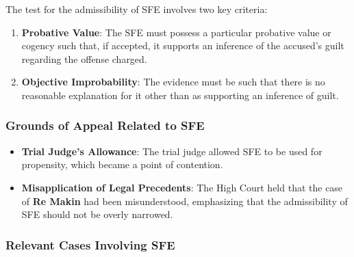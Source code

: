 The test for the admissibility of SFE involves two key criteria:

\begin{enumerate}
\def\labelenumi{\arabic{enumi}.}
\tightlist
\item
  \textbf{Probative Value}: The SFE must possess a particular probative
  value or cogency such that, if accepted, it supports an inference of
  the accused's guilt regarding the offense charged.
\item
  \textbf{Objective Improbability}: The evidence must be such that there
  is no reasonable explanation for it other than as supporting an
  inference of guilt.
\end{enumerate}

\subsubsection{Grounds of Appeal Related to
SFE}\label{grounds-of-appeal-related-to-sfe}

\begin{itemize}
\tightlist
\item
  \textbf{Trial Judge's Allowance}: The trial judge allowed SFE to be
  used for propensity, which became a point of contention.
\item
  \textbf{Misapplication of Legal Precedents}: The High Court held that
  the case of \textbf{Re Makin} had been misunderstood, emphasizing that
  the admissibility of SFE should not be overly narrowed.
\end{itemize}

\subsubsection{Relevant Cases Involving
SFE}\label{relevant-cases-involving-sfe}


